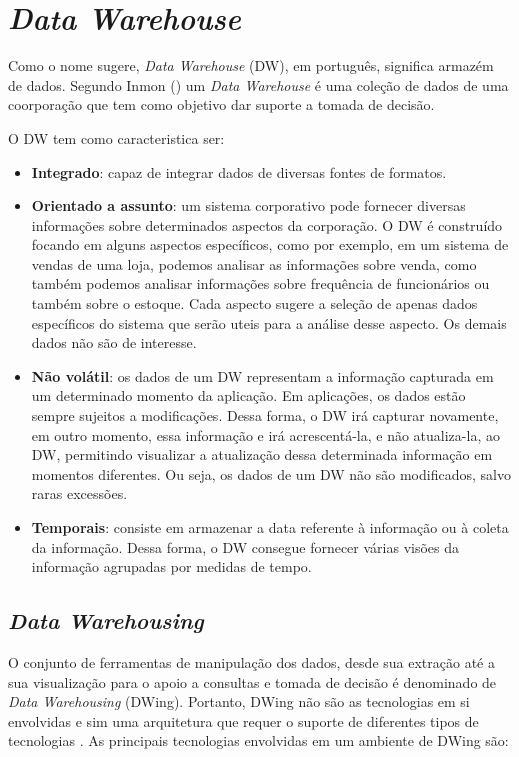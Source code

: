 \chapter{\emph{Data Warehouse}}
\label{cap-dw}

%

Como o nome sugere, \emph{Data Warehouse} (DW), em português, significa armazém de dados. Segundo Inmon (\citeyear{inmon2002}) um \emph{Data Warehouse} é uma coleção de dados de uma coorporação que tem como objetivo dar suporte a tomada de decisão.

%

O DW tem como caracteristica ser:

%

\begin{itemize}
\item \textbf{Integrado}: capaz de integrar dados de diversas fontes de formatos.
\item \textbf{Orientado a assunto}: um sistema corporativo pode fornecer diversas informações sobre determinados aspectos da corporação. O DW é construído focando em alguns aspectos específicos, como por exemplo, em um sistema de vendas de uma loja, podemos analisar as informações sobre venda, como também podemos analisar informações sobre frequência de funcionários ou também sobre o estoque. Cada aspecto sugere a seleção de apenas dados específicos do sistema que serão uteis para a análise desse aspecto. Os demais dados não são de interesse.
\item \textbf{Não volátil}: os dados de um DW representam a informação capturada em um determinado momento da aplicação. Em aplicações, os dados estão sempre sujeitos a modificações. Dessa forma, o DW irá capturar novamente, em outro momento, essa informação e irá acrescentá-la, e não atualiza-la, ao DW, permitindo visualizar a atualização dessa determinada informação em momentos diferentes. Ou seja, os dados de um DW não são modificados, salvo raras excessões.
\item \textbf{Temporais}: consiste em armazenar a data referente à informação ou à coleta da informação. Dessa forma, o DW consegue fornecer várias visões da informação agrupadas por medidas de tempo. 
\end{itemize}

\section{\emph{Data Warehousing}}

O conjunto de ferramentas de manipulação dos dados, desde sua extração até a sua visualização para o apoio a consultas e tomada de decisão é denominado de \emph{Data Warehousing} (DWing). Portanto,  DWing não são as tecnologias em si envolvidas e sim uma arquitetura que requer o suporte de diferentes tipos de tecnologias \cite{inmon2002}.  As principais tecnologias envolvidas em um ambiente de DWing são:

